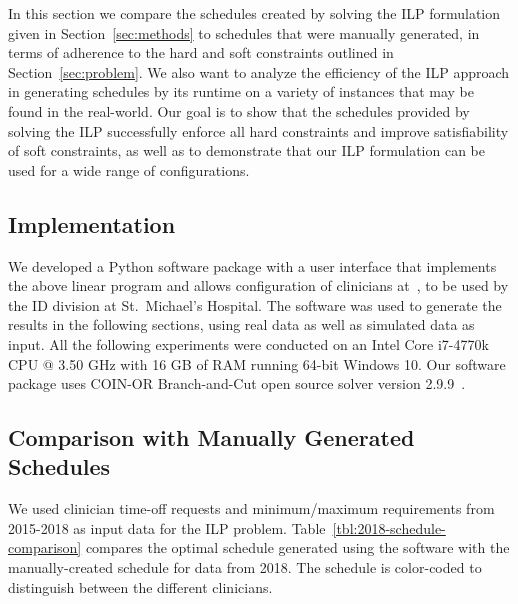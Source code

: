 In this section we compare the schedules created by solving the ILP formulation
given in Section~\ref{sec:methods} to schedules that were manually generated,
in terms of adherence to the hard and soft constraints outlined in Section~\ref{sec:problem}.
We also want to analyze the efficiency of the ILP approach in generating schedules
by its runtime on a variety of instances that may be found in the real-world.
Our goal is to show that the schedules provided by solving the ILP successfully
enforce all hard constraints and improve satisfiability of soft constraints, 
as well as to demonstrate that our ILP formulation can be used for a wide range
of configurations.

\subsection{Implementation}
We developed a Python software package with a user interface that implements the above
linear program and allows configuration of clinicians at~\cite{...}, to be
used by the ID division at St.\ Michael's Hospital. The software was used to
generate the results in the following sections, using real data as well as
simulated data as input. All the following experiments were conducted on an
Intel Core i7-4770k CPU @ 3.50 GHz with 16 GB of RAM running 64-bit Windows 10.
Our software package uses COIN-OR Branch-and-Cut open source solver
version 2.9.9~\cite{johnjforrest_coin-or/cbc:_2019}.

\subsection{Comparison with Manually Generated Schedules}  %
We used clinician time-off requests and minimum/maximum requirements from
2015-2018 as input data for the ILP problem.
Table~\ref{tbl:2018-schedule-comparison} compares the optimal schedule generated using
the software with the manually-created schedule for data from 2018. The
schedule is color-coded to distinguish between the different clinicians.



